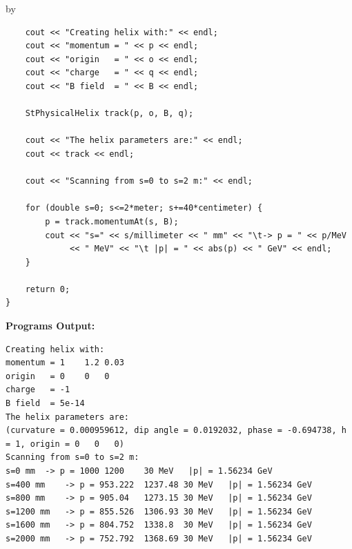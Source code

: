 \documentclass[twoside]{article}
\newcommand{\entrylabel}[1]{\mbox{\textbf{{#1}}}\hfil}%
\newenvironment{entry}
{\begin{list}{}%
    {\renewcommand{\makelabel}{\entrylabel}%
     \setlength{\labelwidth}{90pt}%
     \setlength{\leftmargin}{\labelwidth}
     \advance\leftmargin by \labelsep%
      }%
    }%
  {\end{list}}
\newcommand{\Entrylabel}[1]%
{\raisebox{0pt}[1ex][0pt]{\makebox[\labelwidth][l]%
    {\parbox[t]{\labelwidth}{\hspace{0pt}\textbf{{#1}}}}}}
\newenvironment{Entry}%
{\renewcommand{\entrylabel}{\Entrylabel}\begin{entry}}%
  {\end{entry}}
\begin{document}
\begin{Entry}
{\begin{verbatim}
    cout << "Creating helix with:" << endl;
    cout << "momentum = " << p << endl;
    cout << "origin   = " << o << endl;
    cout << "charge   = " << q << endl;
    cout << "B field  = " << B << endl;

    StPhysicalHelix track(p, o, B, q);

    cout << "The helix parameters are:" << endl;
    cout << track << endl;
    
    cout << "Scanning from s=0 to s=2 m:" << endl;

    for (double s=0; s<=2*meter; s+=40*centimeter) {
        p = track.momentumAt(s, B);
        cout << "s=" << s/millimeter << " mm" << "\t-> p = " << p/MeV
             << " MeV" << "\t |p| = " << abs(p) << " GeV" << endl; 
    }
    
    return 0;
}
\end{verbatim}
}%
{\bf Programs Output:}
{\footnotesize
\begin{verbatim}
Creating helix with:
momentum = 1	1.2	0.03
origin   = 0	0	0
charge   = -1
B field  = 5e-14
The helix parameters are:
(curvature = 0.000959612, dip angle = 0.0192032, phase = -0.694738, h = 1, origin = 0	0	0)
Scanning from s=0 to s=2 m:
s=0 mm	-> p = 1000	1200	30 MeV	 |p| = 1.56234 GeV
s=400 mm	-> p = 953.222	1237.48	30 MeV	 |p| = 1.56234 GeV
s=800 mm	-> p = 905.04	1273.15	30 MeV	 |p| = 1.56234 GeV
s=1200 mm	-> p = 855.526	1306.93	30 MeV	 |p| = 1.56234 GeV
s=1600 mm	-> p = 804.752	1338.8	30 MeV	 |p| = 1.56234 GeV
s=2000 mm	-> p = 752.792	1368.69	30 MeV	 |p| = 1.56234 GeV
\end{verbatim}
} %
\end{Entry}

\clearpage

%
%
\end{document}

